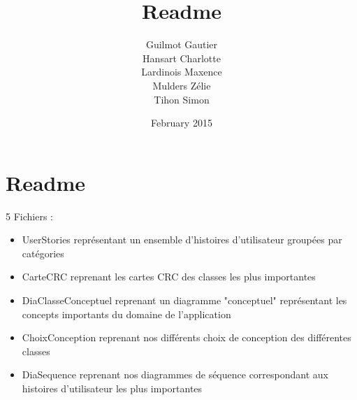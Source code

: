 \documentclass[11pt,a4paper]{article}
\title{Readme}
\author{Guilmot Gautier \\ Hansart Charlotte \\ Lardinois Maxence \\ Mulders Zélie \\ Tihon Simon  }
\date{February 2015}
\begin{document}
\maketitle
\section{Readme}

5 Fichiers : 
\\
\begin{itemize}\renewcommand{\labelitemi}{$\bullet$}
\item UserStories représentant un ensemble d'histoires d'utilisateur groupées par catégories 
\item CarteCRC reprenant les cartes CRC des classes les plus importantes
\item DiaClasseConceptuel reprenant un diagramme "conceptuel" représentant les
concepts importants du domaine de l'application
\item ChoixConception reprenant nos différents choix de conception des différentes classes
\item DiaSequence reprenant nos diagrammes de séquence correspondant aux histoires d’utilisateur les plus importantes 

\end{itemize}
\end{document}
